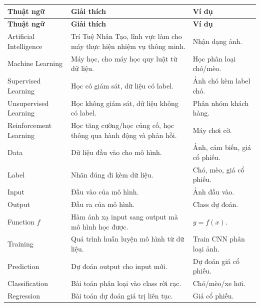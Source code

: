 \small
\begin{longtable}{p{}p{}p{}}
\toprule
\textbf{Thuật ngữ} & \textbf{Giải thích} & \textbf{Ví dụ} \\
\midrule
\endfirsthead

\toprule
\textbf{Thuật ngữ} & \textbf{Giải thích} & \textbf{Ví dụ} \\
\midrule
\endhead

Artificial Intelligence & Trí Tuệ Nhân Tạo, lĩnh vực làm cho máy thực hiện nhiệm vụ thông minh. & Nhận dạng ảnh. \\

Machine Learning & Máy học, cho máy học quy luật từ dữ liệu. & Học phân loại chó/mèo. \\

Supervised Learning & Học có giám sát, dữ liệu có label. & Ảnh chó kèm label chó. \\

Unsupervised Learning & Học không giám sát, dữ liệu không có label. & Phân nhóm khách hàng. \\

Reinforcement Learning & Học tăng cường/học củng cố, học thông qua hành động và phản hồi. & Máy chơi cờ. \\

Data & Dữ liệu đầu vào cho mô hình. & Ảnh, cảm biến, giá cổ phiếu. \\

Label & Nhãn đúng đi kèm dữ liệu. & Chó, mèo, giá cổ phiếu. \\

Input & Đầu vào của mô hình. & Ảnh đầu vào. \\

Output & Đầu ra của mô hình. & Class dự đoán. \\

Function $f$ & Hàm ánh xạ input sang output mà mô hình học được. & $y=f(x)$. \\

Training & Quá trình huấn luyện mô hình từ dữ liệu. & Train CNN phân loại ảnh. \\

Prediction & Dự đoán output cho input mới. & Dự đoán giá cổ phiếu. \\

Classification & Bài toán phân loại vào class rời rạc. & Chó/mèo/xe hơi. \\

Regression & Bài toán dự đoán giá trị liên tục. & Giá cổ phiếu. \\


\end{longtable}
